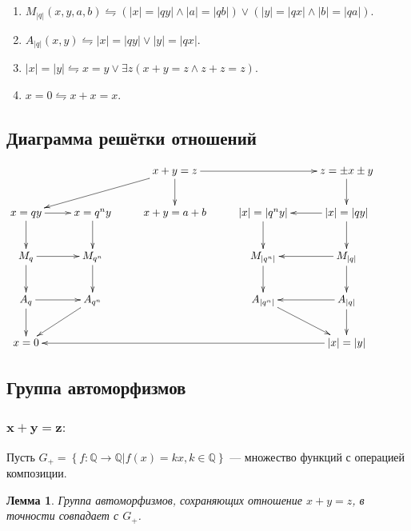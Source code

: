\documentclass[12pt]{article}
\newtheorem{lemma}[theorem]{{\indent \bf Лемма}}
\theoremstyle{definition}
\newcommand{\TODO}[1]{\textcolor{todocolor}{ЗДЕСЬ #1}}
\newcommand{\wed}{\wedge} %
\newcommand{\defineset}[2]{\left\{
	\left.
	#1
	\right\vert
	#2
	\right\}}
\begin{document}
\begin{enumerate}
	\TODO{написать определние $ |x| = |qy| $ через $\pm x \pm y = z$.}
	
	\item $ M_{|q|}(x, y, a, b) \leftrightharpoons (|x| = |qy| \wed |a| = |qb|) \vee (|y| = |qx| \wed |b| = |qa|) $.
	
	\item $ A_{|q|}(x, y) \leftrightharpoons |x| = |qy| \vee |y| = |qx| $.  

	\item $ |x| = |y| \leftrightharpoons x = y \vee \exists z (x + y = z \wed z + z = z) $.
	
	\item $ x = 0 \leftrightharpoons x + x = x $.
	    
	\end{enumerate}
	
	\subsection{Диаграмма решётки отношений}
	
	$$ \xymatrix{
		& & x + y = z 
		\ar@{->}[dll] \ar@{->}[d] \ar@{->}[rr] && z = \pm x \pm y \ar@{->}[d]& \\
		x = qy \ar@{->}[d] \ar@{->}[r] & 
		x = q^ny \ar@{->}[d] & 
		x + y = a + b & 
		|x| = |q^ny| \ar@{->}[d] & 
		|x| = |qy| \ar@{->}[d] \ar@{->}[l] \\
		M_{q} \ar@{->}[d] \ar@{->}[r] &
		M_{q^n} \ar@{->}[d] & &
		M_{|q^n|} \ar@{->}[d] &
		M_{|q|} \ar@{->}[d] \ar@{->}[l] \\
		A_{q} \ar@{->}[d] \ar@{->}[r] &
		A_{q^n} \ar@{->}[ld] & &
		A_{|q^n|} \ar@{->}[rd] & 
		A_{|q|} \ar@{->}[d] \ar@{->}[l] \\
		x = 0 & & & & 
		|x| = |y| \ar@{->}[llll] \\
	}$$
	
	\subsection{Группа автоморфизмов}
	    \subsubsection{$\mathbf{x + y = z:}$}
	    
	    Пусть $ G_{+} = \defineset{f \colon \mathbb{Q} \longrightarrow \mathbb{Q}}{f(x) = kx, k \in \mathbb{Q}} $ --- множество функций с операцией композиции. 
    
    \begin{lemma}
    	Группа автоморфизмов, сохраняющих отношение $ x + y = z $, в точности совпадает с $ G_{+} $.
    \end{lemma}
    
\end{document}
